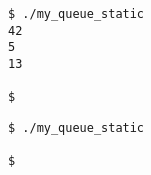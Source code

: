 \bigskip

\lstset{language=sh}
\begin{lstlisting}[frame=single,title={Exemple d'affichage du cas normal : file contenant 42, 5, 13}]
$ ./my_queue_static
42
5
13

$
\end{lstlisting}

\bigskip

\lstset{language=sh}
\begin{lstlisting}[frame=single,title={Exemple d'affichage d'une file vide}]
$ ./my_queue_static

$
\end{lstlisting}
